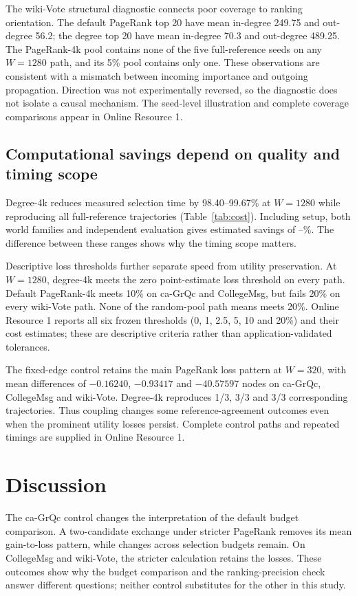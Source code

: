 \documentclass[smallextended]{svjour3}
\begin{document}
The wiki-Vote structural diagnostic connects poor coverage to ranking orientation. The default PageRank top 20 have mean in-degree 249.75 and out-degree 56.2; the degree top 20 have mean in-degree 70.3 and out-degree 489.25. The PageRank-4k pool contains none of the five full-reference seeds on any $W=1280$ path, and its 5\% pool contains only one. These observations are consistent with a mismatch between incoming importance and outgoing propagation. Direction was not experimentally reversed, so the diagnostic does not isolate a causal mechanism. The seed-level illustration and complete coverage comparisons appear in Online Resource 1.

\subsection{Computational savings depend on quality and timing scope}
Degree-4k reduces measured selection time by 98.40--99.67\% at $W=1280$ while reproducing all full-reference trajectories (Table~\ref{tab:cost}). Including setup, both world families and independent evaluation gives estimated savings of \CollegeDegreeSaving{}--\WikiDegreeSaving{}\%. The difference between these ranges shows why the timing scope matters.


Descriptive loss thresholds further separate speed from utility preservation. At $W=1280$, degree-4k meets the zero point-estimate loss threshold on every path. Default PageRank-4k meets 10\% on ca-GrQc and CollegeMsg, but fails 20\% on every wiki-Vote path. None of the random-pool path means meets 20\%. Online Resource 1 reports all six frozen thresholds (0, 1, 2.5, 5, 10 and 20\%) and their cost estimates; these are descriptive criteria rather than application-validated tolerances.

The fixed-edge control retains the main PageRank loss pattern at $W=320$, with mean differences of $-0.16240$, $-0.93417$ and $-40.57597$ nodes on ca-GrQc, CollegeMsg and wiki-Vote. Degree-4k reproduces 1/3, 3/3 and 3/3 corresponding trajectories. Thus coupling changes some reference-agreement outcomes even when the prominent utility losses persist. Complete control paths and repeated timings are supplied in Online Resource 1.
\FloatBarrier

\section{Discussion}
The ca-GrQc control changes the interpretation of the default budget comparison. A two-candidate exchange under stricter PageRank removes its mean gain-to-loss pattern, while changes across selection budgets remain. On CollegeMsg and wiki-Vote, the stricter calculation retains the losses. These outcomes show why the budget comparison and the ranking-precision check answer different questions; neither control substitutes for the other in this study.
\end{document}

